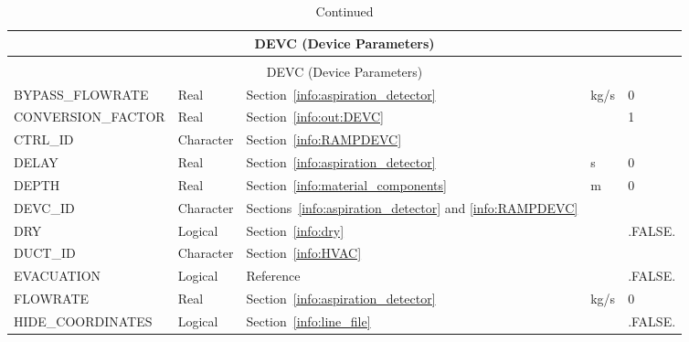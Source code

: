 \documentclass[11pt]{book}
\begin{document}
\begin{longtable}{@{\extracolsep{\fill}}|l|l|l|l|l|}
\caption[Device parameters ({\ct DEVC} namelist group)]{For more information see Section~\ref{info:DEVC}.}
\label{tbl:DEVC} \\
\hline
\multicolumn{5}{|c|}{{\ct DEVC} (Device Parameters)} \\
\hline \hline
\endfirsthead
\caption[]{Continued} \\
\hline
\multicolumn{5}{|c|}{{\ct DEVC} (Device Parameters)} \\
\hline \hline
\endhead
{\ct BYPASS\_FLOWRATE}      & Real            & Section~\ref{info:aspiration_detector}                          & kg/s  & 0             \\ \hline
{\ct CONVERSION\_FACTOR}    & Real            & Section~\ref{info:out:DEVC}                                     &       & 1             \\ \hline
{\ct CTRL\_ID}              & Character       & Section~\ref{info:RAMPDEVC}                                     &       &               \\ \hline
{\ct DELAY}                 & Real            & Section~\ref{info:aspiration_detector}                          & s     & 0             \\ \hline
{\ct DEPTH}                 & Real            & Section~\ref{info:material_components}                          & m     & 0             \\ \hline
{\ct DEVC\_ID}              & Character       & Sections~\ref{info:aspiration_detector} and \ref{info:RAMPDEVC} &       &               \\ \hline
{\ct DRY}                   & Logical         & Section~\ref{info:dry}                                          &       & {\ct .FALSE.} \\ \hline
{\ct DUCT\_ID}              & Character       & Section~\ref{info:HVAC}                                         &       &               \\ \hline
{\ct EVACUATION}            & Logical         & Reference~\cite{FDS_Evac_Users_Guide}                           &       & {\ct .FALSE.}    \\ \hline
{\ct FLOWRATE}              & Real            & Section~\ref{info:aspiration_detector}                          & kg/s  & 0             \\ \hline
{\ct HIDE\_COORDINATES}     & Logical         & Section~\ref{info:line_file}                                    &       & {\ct .FALSE.} \\ \hline

\end{longtable}
\end{document}
